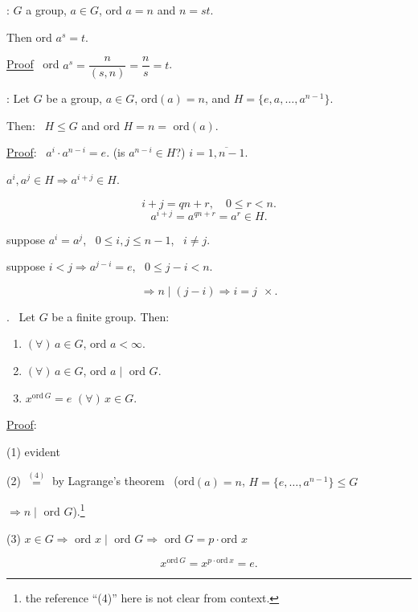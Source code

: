 \documentclass[12pt]{article}
\begin{document}
\noindent{}: $G$ a group, $a\in G$, ord $a=n$ and $n=st$.

\noindent Then ord $a^s=t$.

\bigskip
\noindent\underline{Proof} \ ord $a^s = \dfrac{n}{(s,n)} = \dfrac{n}{s} = t$.

\bigskip
\noindent{}: Let $G$ be a group, $a\in G$, ord$(a)=n$, and $H=\{e,a,\ldots,a^{n-1}\}$.

\noindent Then: \ $H\leq G$ and ord $H=n=$ ord$(a)$.

\bigskip
\noindent\underline{Proof}: \ $a^i\cdot a^{n-i}=e$. \quad (is $a^{n-i}\in H$?) \quad $i=\overline{1,n-1}$.

\bigskip
\noindent $a^i,a^j\in H \Rightarrow a^{i+j}\in H$.

\[
i+j=qn+r, \quad 0\leq r<n.
\]
\[
a^{i+j}=a^{qn+r}=a^r\in H.
\]

\bigskip
\noindent suppose $a^i=a^j$, \ $0\leq i,j\leq n-1$, \ $i\neq j$.

\noindent suppose $i<j \Rightarrow a^{j-i}=e$, \ $0\leq j-i<n$.

\[
\Rightarrow n\mid(j-i) \Rightarrow i=j \ \ \times.
\]

\bigskip
\noindent{}. \ Let $G$ be a finite group. Then:

\begin{enumerate}
\item[(1)] $(\forall)\,a\in G$, ord $a<\infty$.
\item[(2)] $(\forall)\,a\in G$, ord $a\mid$ ord $G$.
\item[(3)] $x^{\text{ord}\,G}=e$ $(\forall)\,x\in G$.
\end{enumerate}

\bigskip
\noindent\underline{Proof}:

\noindent (1) evident

\noindent (2) $\overset{(4)}{=}$ by Lagrange's theorem \ (ord$(a)=n$, $H=\{e,\ldots,a^{n-1}\}\leq G$

\noindent $\Rightarrow n\mid$ ord $G$).\footnote{the reference ``(4)'' here is not clear from context.}

\bigskip
\noindent (3) $x\in G \Rightarrow$ ord $x\mid$ ord $G \Rightarrow$ ord $G = p\cdot$ord $x$

\[
x^{\text{ord}\,G} = x^{p\cdot\text{ord}\,x} = e.
\]
\end{document}

